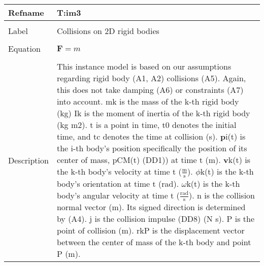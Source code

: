 \documentclass[12pt]{article}
\begin{document}
\noindent \begin{minipage}{\textwidth}
\begin{tabular}{p{} p{}}
\toprule \textbf{Refname} & \textbf{T:im3}
\label{T:im3}
\\ \midrule \\
Label & Collisions on 2D rigid bodies
\\ \midrule \\
Equation & $\mathbf{F}=m$
\\ \midrule \\
Description & This instance model is based on our assumptions regarding rigid body (A1, A2) collisions (A5). Again, this does not take damping (A6) or constraints (A7) into account. mk is the mass of the k-th rigid body (kg) Ik is the moment of inertia of the k-th rigid body (kg m2). t is a point in time, t0 denotes the initial time, and tc denotes the time at collision (s). $\mathbf{p}$i(t) is the i-th body's position specifically the position of its center of mass, pCM(t) (DD1)) at time t (m). $\mathbf{v}$k(t) is the k-th body's velocity at time t ($\frac{\text{m}}{\text{s}}$). $\phi{}$k(t) is the k-th body's orientation at time t (rad). $\omega{}$k(t) is the k-th body's angular velocity at time t ($\frac{\text{rad}}{\text{s}}$). n is the collision normal vector (m). Its signed direction is determined by (A4). j is the collision impulse (DD8) (N s). P is the point of collision (m). rkP is the displacement vector between the center of mass of the k-th body and point P (m).
\\ \bottomrule \end{tabular}
\end{minipage}\\
\end{document}
